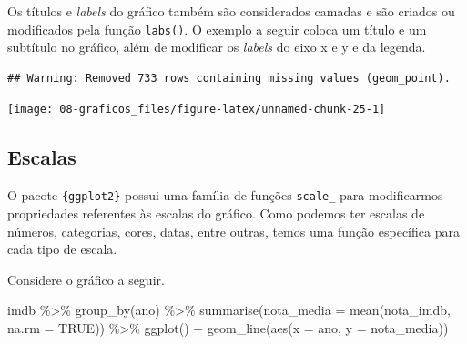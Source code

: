 \documentclass[
]{book}
\newenvironment{Shaded}{\begin{snugshade}}{\end{snugshade}}
\newcommand{\AttributeTok}[1]{\textcolor[rgb]{0.77,0.63,0.00}{#1}}
\newcommand{\ConstantTok}[1]{\textcolor[rgb]{0.00,0.00,0.00}{#1}}
\newcommand{\FunctionTok}[1]{\textcolor[rgb]{0.00,0.00,0.00}{#1}}
\newcommand{\NormalTok}[1]{#1}
\newcommand{\SpecialCharTok}[1]{\textcolor[rgb]{0.00,0.00,0.00}{#1}}
\newcommand{\StringTok}[1]{\textcolor[rgb]{0.31,0.60,0.02}{#1}}
\begin{document}
Os títulos e \emph{labels} do gráfico também são considerados camadas e são criados ou modificados pela função \texttt{labs()}. O exemplo a seguir coloca um título e um subtítulo no gráfico, além de modificar os \emph{labels} do eixo x e y e da legenda.

\begin{Shaded}
\end{Shaded}

\begin{verbatim}
## Warning: Removed 733 rows containing missing values (geom_point).
\end{verbatim}

\begin{center}\texttt{[image: 08-graficos\_files/figure-latex/unnamed-chunk-25-1]} \end{center}

\hypertarget{escalas}{%
\subsection{Escalas}\label{escalas}}

O pacote \texttt{\{ggplot2\}} possui uma família de funções \texttt{scale\_} para modificarmos propriedades referentes às escalas do gráfico. Como podemos ter escalas de números, categorias, cores, datas, entre outras, temos uma função específica para cada tipo de escala.

Considere o gráfico a seguir.

\begin{Shaded}
\begin{Highlighting}[]
\NormalTok{imdb }\SpecialCharTok{\%\textgreater{}\%} 
  \FunctionTok{group\_by}\NormalTok{(ano) }\SpecialCharTok{\%\textgreater{}\%} 
  \FunctionTok{summarise}\NormalTok{(}\AttributeTok{nota\_media =} \FunctionTok{mean}\NormalTok{(nota\_imdb, }\AttributeTok{na.rm =} \ConstantTok{TRUE}\NormalTok{)) }\SpecialCharTok{\%\textgreater{}\%} 
  \FunctionTok{ggplot}\NormalTok{() }\SpecialCharTok{+}
  \FunctionTok{geom\_line}\NormalTok{(}\FunctionTok{aes}\NormalTok{(}\AttributeTok{x =}\NormalTok{ ano, }\AttributeTok{y =}\NormalTok{ nota\_media))}
\end{Highlighting}
\end{Shaded}
\end{document}
